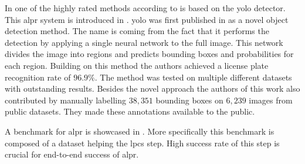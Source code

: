 




In one of the highly rated methods according to \cite{survOnMet} is based on the \gls{yolo} detector.
This \gls{alpr} system is introduced in \cite{DBLP:journals/corr/abs-1909-01754}. \gls{yolo} was first published in \cite{redmon2016look} as a novel object detection method.
The name is coming from the fact that it performs the detection by applying a single neural network to the full image.
This network divides the image into regions and predicts bounding boxes and probabilities for each region. 
Building on this method the authors achieved a license plate recognition rate of $96.9\%$.
The method was tested on multiple different datasets with outstanding results. 
Besides the novel approach the authors of this work also contributed by manually labelling $38,351$ bounding boxes on $6,239$ images from public datasets.
They made these annotations available to the public.

A benchmark for \gls{alpr} is showcased in \cite{DBLP:journals/corr/GoncalvesSMS16}. More specifically this benchmark is composed of a dataset helping the \gls{lpcs} step. High success rate of this step is crucial for end-to-end success of \gls{alpr}.






